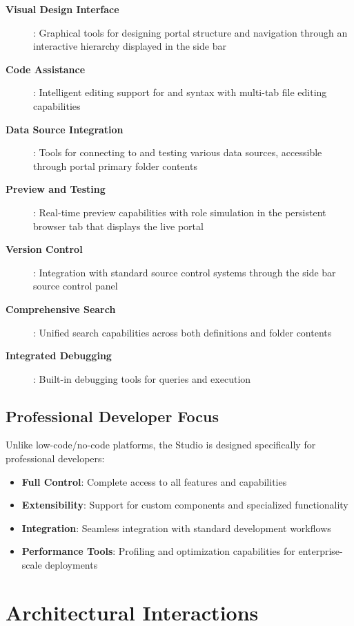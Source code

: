 \begin{description}
\item[\textbf{Visual Design Interface}]: Graphical tools for designing portal structure and navigation through an interactive \webbase{} hierarchy displayed in the side bar
\item[\textbf{Code Assistance}]: Intelligent editing support for \wbdl{} and \wbpl{} syntax with multi-tab file editing capabilities
\item[\textbf{Data Source Integration}]: Tools for connecting to and testing various data sources, accessible through portal primary folder contents
\item[\textbf{Preview and Testing}]: Real-time preview capabilities with role simulation in the persistent browser tab that displays the live portal
\item[\textbf{Version Control}]: Integration with standard source control systems through the side bar source control panel
\item[\textbf{Comprehensive Search}]: Unified search capabilities across both \webbase{} definitions and folder contents
\item[\textbf{Integrated Debugging}]: Built-in debugging tools for \wbpl{} queries and \webbaselet{} execution
\end{description}

\subsection{Professional Developer Focus}

Unlike low-code/no-code platforms, the Studio is designed specifically for professional developers:

\begin{itemize}
	\item \textbf{Full Control}: Complete access to all \wbdl{} features and capabilities
	\item \textbf{Extensibility}: Support for custom components and specialized functionality
	\item \textbf{Integration}: Seamless integration with standard development workflows
	\item \textbf{Performance Tools}: Profiling and optimization capabilities for enterprise-scale deployments
\end{itemize}

\section{Architectural Interactions}
\label{sec:architectural-interactions}

